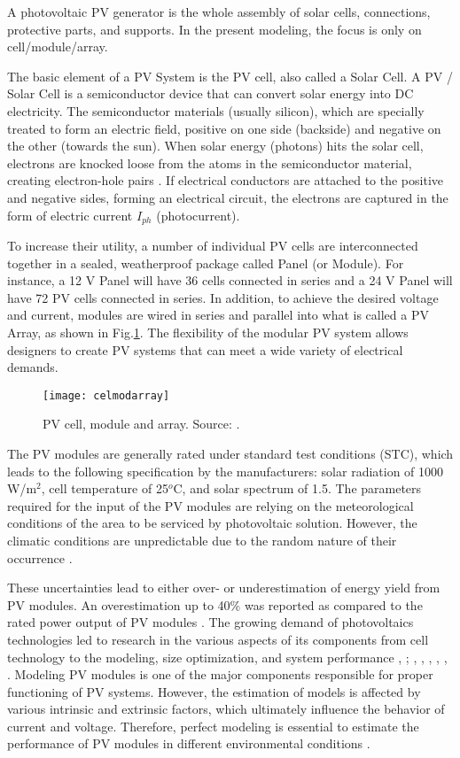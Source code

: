 A photovoltaic PV generator is the whole assembly of solar cells, connections, protective parts, and supports. In the present modeling, the focus is only on cell/module/array.
 
The basic element of a PV System is the PV cell, also called a Solar Cell. A PV / Solar Cell is a semiconductor device that can convert solar energy into DC electricity. The semiconductor materials (usually silicon), which are specially treated to form an electric field, positive on one side (backside) and negative on the other (towards the sun). When solar energy (photons) hits the solar cell, electrons are knocked loose from the atoms in the semiconductor material, creating electron-hole pairs \cite{Lorenzo}. If electrical conductors are attached to the positive and negative sides, forming an electrical circuit, the electrons are captured in the form of electric current $ I_{ph} $ (photocurrent).
 
To increase their utility, a number of individual PV cells are interconnected together in a sealed, weatherproof package called Panel (or Module). For instance, a 12 V Panel will have 36 cells connected in series and a 24 V Panel will have 72 PV cells connected in series. In addition, to achieve the desired voltage and current, modules are wired in series and parallel into what is called a PV Array, as shown in Fig.\ref{fig:celmodarray}. The flexibility of the modular PV system allows designers to create PV systems that can meet a wide variety of electrical demands. 

\begin{figure}[h]
\texttt{[image: celmodarray]}
\centering
\caption{PV cell, module and array. Source: \cite{SamlexSolar}.}
\label{fig:celmodarray}
\end{figure}

The PV modules are generally rated under standard test conditions (STC), which leads to the following specification by the manufacturers:  solar radiation of 1000 W/m$^{2}$, cell temperature of 25$^{o}$C, and solar spectrum of 1.5. The parameters required for the input of the PV modules are relying on the meteorological conditions of the area to be serviced by photovoltaic solution. However, the climatic conditions are unpredictable due to the random nature of their occurrence \cite{Jakhrani}.
 
These uncertainties lead to either over- or underestimation of energy yield from PV modules. An overestimation up to 40\% was reported as compared to the rated power output of PV modules \cite{Durisch}. The growing demand of photovoltaics technologies led to research in the various aspects of its components from cell technology to the modeling, size optimization, and system performance \cite{Rajanna}, \cite{Badejani}; \cite{Yatimi}, \cite{Ferrari}, \cite{Saloux}, \cite{Hasan}, \cite{King}, \cite{Mellit}. Modeling PV modules is one of the major components responsible for proper functioning of PV systems. However, the estimation of models is affected by various intrinsic and extrinsic factors, which ultimately influence the behavior of current and voltage. Therefore, perfect modeling is essential to estimate the performance of PV modules in different environmental conditions \cite{Jakhrani}.
 
